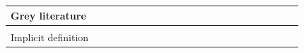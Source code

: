 \documentclass[english, 12pt, a4paper, sci, utf8, a-1b, online]{aaltothesis}
\begin{document}
\begin{center}
\begin{longtable}{p{0.3\linewidth}p{0.6\linewidth}}
    \textbf{Grey literature}                                                                                                                                                                                                                                                                                                                                                                                                                                                                                                                                                                                                                                                                                                                                                                                                                                                                                                            \\
    \hline                                                                                                                                                                                                                                                                                                                                                                                                                                                                                                                                                                                                                                                                                                                                                                                                                                                                                                                              \\
    Implicit definition & \newline \textcite{great-dx-and-the-people-who-make-them} \newline \textcite{heroku-dx} \newline \textcite{api-developer-experience-dx-resources} \newline \textcite{developer-experience-sanity}                                                                                                                                                                                                                                                                                                                                                                                                                                                                                                                                                                                                                                                                                                             \\

\end{longtable}
\end{center}
\end{document}
